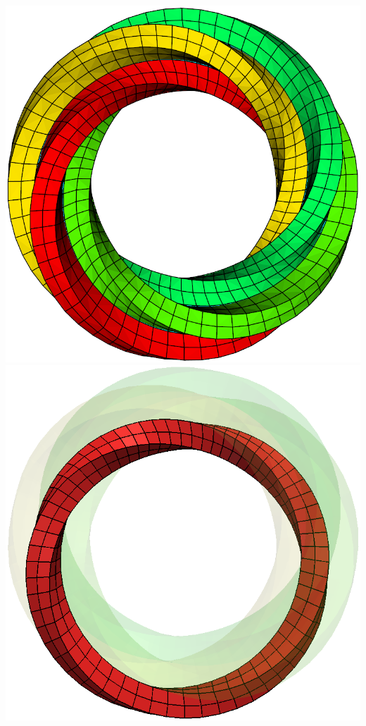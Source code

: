 \documentclass[12pt]{beamer}
\begin{document}
\begin{frame}
  \begin{center}
    \includegraphics[height=0.6\textheight]{./images/circular-base-x4.png}
    \includegraphics[height=0.6\textheight]{./images/circular-base-x1.png}
  \end{center}
\end{frame}
\end{document}

